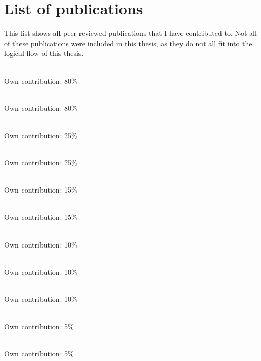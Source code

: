 \chapter{List of publications}


\label{chp:Publicationlist}


This list shows all peer-reviewed publications that I have contributed to. Not all of these publications were included in this thesis, as they do not all fit into the logical flow of this thesis.\\

\noindent{}\\ \strut \hfill Own contribution: 80\%\\

\noindent{}\\ \strut \hfill Own contribution: 80\%\\

\noindent{}\\ \strut \hfill Own contribution: 25\%\\

\noindent{} \\ \strut \hfill Own contribution: 25\%\\

\noindent{}\\ \strut \hfill Own contribution: 15\%\\

\noindent{}\\ \strut \hfill Own contribution: 15\%\\

\noindent{}\\ \strut \hfill Own contribution: 10\%\\

\noindent{}\\ \strut \hfill Own contribution: 10\%\\

\noindent{}\\ \strut \hfill Own contribution: 10\%\\

\noindent{}\\ \strut \hfill Own contribution: 5\%\\

\noindent{}\\  \strut \hfill  Own contribution: 5\%\\

